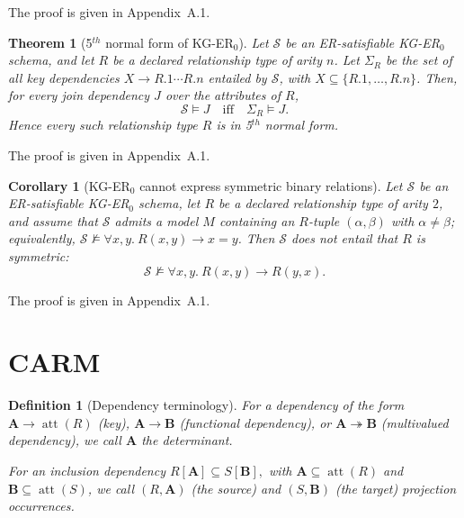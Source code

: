 \documentclass[10pt]{article}
\newtheorem{definition}{Definition}
\newtheorem{theorem}{Theorem}
\newtheorem{corollary}{Corollary}
\begin{document}
The proof is given in Appendix~A.1.


\begin{theorem}[5$^{th}$ normal form of KG-ER$_0$]
\label{thm:kger-5}
Let \(\mathcal S\) be an ER-satisfiable KG-ER\(_0\) schema, and let
\(R\) be a declared relationship type of arity \(n\).  Let
\(\Sigma_R\) be the set of all key dependencies
\(X\to R.1\cdots R.n\) entailed by \(\mathcal S\), with
\(X\subseteq\{R.1,\ldots,R.n\}\).  Then, for every join
dependency \(J\) over the attributes of \(R\),
\[
\mathcal S\models J
\quad\text{iff}\quad
\Sigma_R\models J .
\]
Hence every such relationship type \(R\) is in 5$^{th}$ normal form.
\end{theorem}

The proof is given in Appendix~A.1.


\begin{corollary}[KG-ER$_0$ cannot express symmetric binary relations]
\label{cor:kger-no-symmetry}
Let \(\mathcal S\) be an ER-satisfiable KG-ER\(_0\) schema, let
\(R\) be a declared relationship type of arity \(2\), and assume that
\(\mathcal S\) admits a model \(M\) containing an \(R\)-tuple
\((\alpha,\beta)\) with \(\alpha\neq\beta\); equivalently,
\(\mathcal S\not\models\forall x,y.\ R(x,y)\to x=y\).
Then \(\mathcal S\) does not entail that \(R\) is symmetric:
\[
\mathcal S\not\models \forall x,y.\ R(x, y) \rightarrow R(y, x).
\]
\end{corollary}

The proof is given in Appendix~A.1.




\section{\textsf{CARM}}

\begin{definition}[Dependency terminology]
For a dependency of the form \(\mathbf A \to \operatorname{att}(R)\) (key), \(\mathbf A \to \mathbf B\) (functional dependency), or
\(\mathbf A \twoheadrightarrow \mathbf B\) (multivalued dependency), we call \(\mathbf A\) the
\emph{determinant}.

For an inclusion dependency
\(
R[\mathbf A] \subseteq S[\mathbf B],
\)
with $\mathbf A\subseteq\operatorname{att}(R)$ and $\mathbf B\subseteq\operatorname{att}(S)$,
we call \((R,\mathbf A)\) (the source) and \((S,\mathbf B)\) (the target)
\emph{projection occurrences}.
\end{definition}
\end{document}
